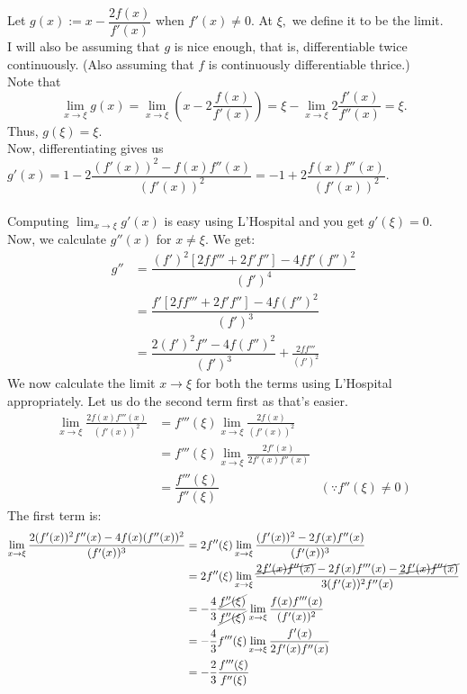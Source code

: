 \documentclass{article}
\begin{document}
\begin{enumerate}
	Let $g(x) := x - \dfrac{2f(x)}{f'(x)}$ when $f'(x) \neq 0.$ At $\xi,$ we define it to be the limit.\\
	I will also be assuming that $g$ is nice enough, that is, differentiable twice continuously. (Also assuming that $f$ is continuously differentiable thrice.)\\
	Note that 
	\[\lim_{x\to \xi}g(x) = \lim_{x\to \xi}\left(x - 2\frac{f(x)}{f'(x)}\right) = \xi - \lim_{x \to \xi}2\frac{f'(x)}{f''(x)} = \xi.\]
	Thus, $g(\xi) = \xi.$\\
	Now, differentiating gives us $g'(x) = 1 - 2\dfrac{(f'(x))^2 - f(x)f''(x)}{(f'(x))^2} = -1 + 2\dfrac{f(x)f''(x)}{(f'(x))^2}.$\\~\\
	Computing $\displaystyle\lim_{x\to \xi}g'(x)$ is easy using L'Hospital and you get $g'(\xi) = 0.$\\
	Now, we calculate $g''(x)$ for $x \neq \xi.$ We get:
	\begin{align*} 
	g'' 	&= \dfrac{(f')^2[2ff''' + 2f'f''] - 4ff'(f'')^2}{(f')^4} \\
			&= \dfrac{f'[2ff''' + 2f'f''] - 4f(f'')^2}{(f')^3}\\
			&= \dfrac{2(f')^2f'' - 4f(f'')^2}{(f')^3} + \frac{2ff'''}{(f')^2}	
	\end{align*}
	We now calculate the limit $x \to \xi$ for both the terms using L'Hospital appropriately. Let us do the second term first as that's easier.
	\begin{align*} 
		\lim_{x\to \xi}\frac{2f(x)f'''(x)}{(f'(x))^2} &= f'''(\xi)\lim_{x\to \xi}\frac{2f(x)}{(f'(x))^2}\\
		&= f'''(\xi)\lim_{x\to \xi}\frac{2f'(x)}{2f'(x)f''(x)}\\
		&= \dfrac{f'''(\xi)}{f''(\xi)} & (\because f''(\xi) \neq 0)
	\end{align*}
	The first term is:
	\begin{align*} 
		\lim_{x\to \xi}\dfrac{2(f'(x))^2f''(x) - 4f(x)(f''(x))^2}{(f'(x))^3} &= 2f''(\xi)\lim_{x\to \xi}\frac{(f'(x))^2 - 2f(x)f''(x)}{(f'(x))^3}\\
		&= 2f''(\xi)\lim_{x\to \xi}\frac{\cancel{2f'(x)f''(x)} - 2f(x)f'''(x) - \cancel{2f'(x)f''(x)}}{3(f'(x))^2f''(x)}\\
		&= -\frac{4}{3}\frac{\cancel{f''(\xi)}}{\cancel{f''(\xi)}}\lim_{x\to \xi}\frac{f(x)f'''(x)}{(f'(x))^2}\\
		&= -\frac{4}{3}f'''(\xi)\lim_{x\to \xi} \frac{f'(x)}{2f'(x)f''(x)}\\
		&= -\frac{2}{3}\frac{f'''(\xi)}{f''(\xi)}

\end{align*}
\end{enumerate}
\end{document}
